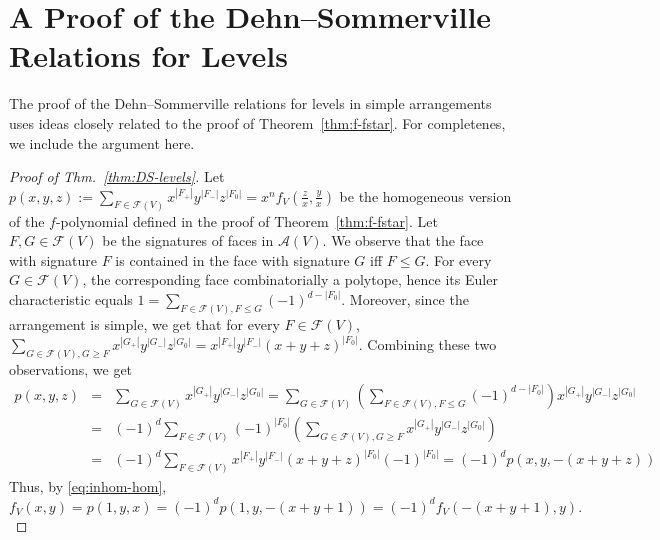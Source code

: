 \documentclass[11pt]{article}
\newcommand{\arr}{\mathcal{A}}
\newcommand{\fhom}{p}
\renewcommand{\leq}{\leqslant}
\renewcommand{\geq}{\geqslant}
\begin{document}
\section{A Proof of the Dehn--Sommerville Relations for Levels}
\label{app_proof-DS}
The proof of the Dehn--Sommerville relations for levels in simple arrangements uses ideas closely related to the proof of Theorem~\ref{thm:f-fstar}. For completenes, we include the argument here.
%
\begin{proof}[Proof of Thm.~\ref{thm:DS-levels}]
Let $\fhom(x,y,z):=\sum_{F\in \mathcal{F}(V)} x^{|F_+|}y^{|F_-|}z^{|F_0|}=x^n f_V(\frac{z}{x},\frac{y}{x})$ be the homogeneous version of the $f$-polynomial defined in the proof of Theorem~\ref{thm:f-fstar}. 
%
Let $F,G \in \mathcal{F}(V)$ be the signatures of faces in $\arr(V)$. We observe that the face with signature $F$ is contained in the face with signature $G$ iff $F\leq G$.
%
For every $G \in \mathcal{F}(V)$, the corresponding face combinatorially a polytope, hence its Euler characteristic equals 
$1=\sum_{F\in \mathcal{F}(V), F\leq G} (-1)^{d-|F_0|}$.
Moreover, since the arrangement is simple, we get that for every $F\in \mathcal{F}(V)$,
$
\sum_{G\in \mathcal{F}(V), G\geq F} x^{|G_+|} y^{|G_-|} z^{|G_0|}=x^{|F_+|} y^{|F_-|}(x+y+z)^{|F_0|}
$.
Combining these two observations, we get
\begin{eqnarray*}
\fhom(x,y,z) & = & \sum_{G\in \mathcal{F}(V)}x^{|G_+|} y^{|G_-|} z^{|G_0|} = \sum_{G\in \mathcal{F}(V)}\left(\sum_{F\in \mathcal{F}(V), F\leq G} (-1)^{d-|F_0|}\right)x^{|G_+|} y^{|G_-|}z^{|G_0|}\\
& = & (-1)^d \sum_{F\in \mathcal{F}(V)} (-1)^{|F_0|} \left( \sum_{G\in \mathcal{F}(V), G\geq F} x^{|G_+|} y^{|G_-|}z^{|G_0|}
\right)\\
& = & (-1)^d \sum_{F\in \mathcal{F}(V)} x^{|F_+|} y^{|F_-|}(x+y+z)^{|F_0|}(-1)^{|F_0|} = (-1)^d p(x,y,-(x+y+z))
\end{eqnarray*}
Thus, by \eqref{eq:inhom-hom}, 
$
f_V(x,y)=p(1,y,x)=(-1)^d p(1,y,-(x+y+1))=(-1)^d f_V(-(x+y+1),y).
$
\end{proof}
%
\end{document}
